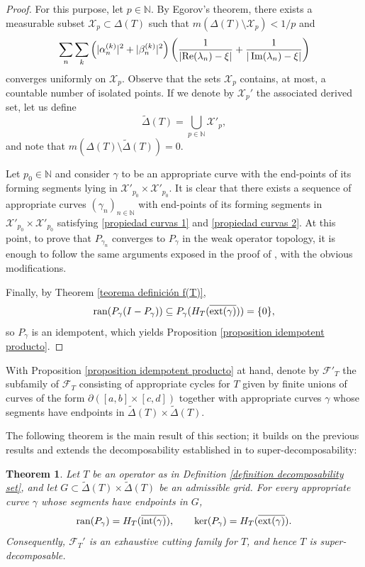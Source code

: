 \documentclass[11pt]{amsart}
\newtheorem{theorem}{Theorem}[section]
\theoremstyle{definition}
\theoremstyle{remark}
\numberwithin{equation}{section}
\DeclareMathOperator*{\Impart}{Im}
\newcommand{\ran}{\textnormal{ran}}
\newcommand{\N}{\mathbb{N}}
\newcommand{\PR}{\textnormal{Re}}
\newcommand{\F}{\mathcal{F}}
\newcommand{\Hint}{H_T(\overline{\inte(\gamma)})}
\newcommand{\Hext}{H_T(\overline{\exte(\gamma)})}
\newcommand{\inte}{\textnormal{int}}
\newcommand{\exte}{\textnormal{ext}}
\begin{document}
\begin{proof}
\medskip

For this purpose, let $p\in \mathbb{N}$. By Egorov's theorem, there exists a measurable subset $\mathcal{X}_p\subset \Delta(T)$ such that $m(\Delta(T)\setminus \mathcal{X}_p) < 1/p$ and
$$
\sum_n \sum_k
\left(|\alpha_n^{(k)}|^2+|\beta_n^{(k)}|^2\right)
\left(
\frac{1}{|\PR(\lambda_n)-\xi|}
+\frac{1}{|\Impart(\lambda_n)-\xi|}
\right)
$$
converges uniformly on $\mathcal{X}_p$. Observe that the sets $\mathcal{X}_p$ contains, at most, a countable number of isolated points. If we denote by $\mathcal{X}_p'$ the associated derived set, let us define
$$
\tilde{\Delta}(T) = \bigcup_{p\in \N} \mathcal{X}'_p,
$$
and note that $m(\Delta(T)\setminus \tilde{\Delta}(T)) = 0$.

Let $p_0 \in \N$ and consider $\gamma$ to be an appropriate curve with the end-points of its forming segments lying in $\mathcal{X}'_{p_0}\times \mathcal{X}'_{p_0}$. It is clear that there exists a sequence of appropriate curves $(\gamma_n)_{n\in \N}$ with end-points of its forming segments in $\mathcal{X}'_{p_0}\times \mathcal{X}'_{p_0}$ satisfying \eqref{propiedad curvas 1} and \eqref{propiedad curvas 2}. At this point, to prove that $P_{\gamma_n}$ converges to $P_\gamma$ in the weak operator topology, it is enough to follow the same arguments exposed in the proof of \cite[Lemma 4.4]{GG3}, with the obvious modifications.

\medskip

Finally, by Theorem \ref{teorema definición f(T)},
$$\ran(P_\gamma(I-P_\gamma)) \subseteq P_\gamma(\Hext) = \{0\},$$
so $P_\gamma$ is an idempotent, which yields Proposition \ref{proposition idempotent producto}.
\end{proof}

With Proposition \ref{proposition idempotent producto} at hand, denote by $\F'_T$ the subfamily of $\F_T$ consisting of appropriate cycles for $T$ given by finite unions of curves of the form $\partial([a,b]\times[c,d])$ together with appropriate curves $\gamma$ whose segments have endpoints in $\tilde{\Delta}(T)\times \tilde{\Delta}(T)$.


\medskip

The following theorem is the main result of this section; it builds on the previous results and extends the decomposability established in \cite{GG3} to super-decomposability:

\begin{theorem}
Let $T$ be an operator as in Definition \ref{definition decomposability set}, and let $G\subset \tilde{\Delta}(T)\times \tilde{\Delta}(T)$ be an admissible grid. For every appropriate curve $\gamma$ whose segments have endpoints in $G$,
\begin{equation}\label{identidad final}
    \ran(P_\gamma) = \Hint, \qquad \ker(P_\gamma) = \Hext.
\end{equation}
Consequently, $\F_T'$ is an exhaustive cutting family for $T$, and hence $T$ is super-decomposable.
\end{theorem}
\end{document}
